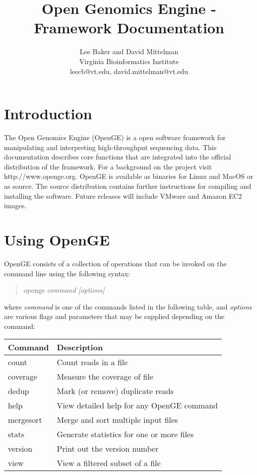 \documentclass[11pt]{article}
\newcommand {\cmd}[1] {\begin{quote}#1\end{quote}}
\begin{document}
\title{Open Genomics Engine - Framework Documentation}
\author{Lee Baker and David Mittelman\\
Virginia Bioinformatics Institute \\
leecb@vt.edu, david.mittelman@vt.edu}
\maketitle

\section {Introduction}
The Open Genomics Engine (OpenGE) is a open software framework for manipulating and interpreting high-throughput sequencing data. This documentation describes core functions that are integrated into the official distribution of the framework. For a background on the project visit http://www.openge.org. OpenGE is available as binaries for Linux and MacOS or as source. The source distribution contains further instructions for compiling and installing the software. Future releases will include VMware and Amazon EC2 images.
\section {Using OpenGE}
OpenGE consists of a collection of operations that can be invoked on the command line using the following syntax:

\cmd{openge \textit{command [options]}}

where \textit{command} is one of the commands listed in the following table, and \textit{options} are various flags and parameters that may be supplied depending on the command:

\begin{center}
\begin{tabular}{lp{3.5in}}
\hline
Command&Description\\ \hline
count&Count reads in a file\\
coverage&Measure the coverage of file\\
dedup&Mark (or remove) duplicate reads\\
help&View detailed help for any OpenGE command\\
mergesort&Merge and sort multiple input files\\
stats&Generate statistics for one or more files\\
version&Print out the version number\\
view&View a filtered subset of a file\\
\end{tabular}
\end{center}
\end{document}

